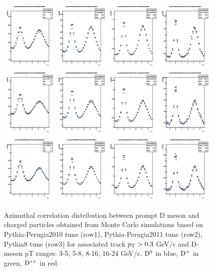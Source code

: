 \begin{figure}
\centering
\includegraphics[width=1\linewidth]{figures/Template/1DCompare_allDpTfromC_AssoPt_0dot3to99dot0GeVc_Perugia2010.png}
\includegraphics[width=1\linewidth]{figures/Template/1DCompare_allDpTfromC_AssoPt_0dot3to99dot0GeVc_Perugia2011.png}
\includegraphics[width=1\linewidth]{figures/Template/1DCompare_allDpTfromC_AssoPt_0dot3to99dot0GeVc_Pythia8.png}
\caption{Azimuthal correlation distribution between prompt D meson and charged particles obtained from Monte Carlo simulations
based on Pythia-Perugia2010 tune (row1), Pythia-Perugia2011 tune (row2), Pythia8 tune (row3) for associated track $p_{\rm T} > 0.3$ GeV/c and D-meson pT ranges: 3-5, 5-8, 8-16, 16-24 GeV/c. ${\rm D^0}$ in blue, ${\rm D^+}$ in green, ${\rm D^{*+}}$ in red.}
\label{templates2}
\end{figure}

\clearpage

\newpage %

